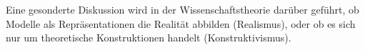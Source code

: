 \documentclass[a4paper, 12pt]{scrartcl}
\begin{document}
Eine gesonderte Diskussion wird in der Wissenschaftstheorie darüber geführt, ob Modelle als Repräsentationen die Realität abbilden (Realismus), oder ob es sich nur um theoretische Konstruktionen handelt (Konstruktivismus).
%
%
%
%
\end{document}
